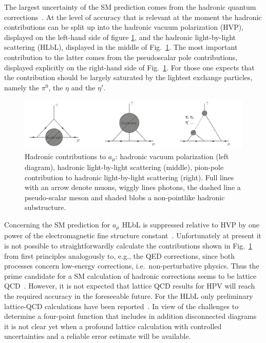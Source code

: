 \documentclass[preprint,12pt,3p]{elsarticle}
\newcommand{\0}{}
\begin{document}
The largest uncertainty of the SM prediction comes from
 the hadronic quantum corrections~\cite{Jegerlehner:2009ry}.
At the level of accuracy that is relevant at the moment the hadronic
contributions can be split up into the hadronic vacuum polarization
(HVP), displayed on the left-hand side of figure \ref{fig:gm2}, and the
hadronic light-by-light scattering (HLbL), displayed in the middle of
Fig.~\ref{fig:gm2}. The most important contribution to the latter
comes from the pseudoscalar pole contributions, displayed explicitly on the right-hand 
side of Fig.~\ref{fig:gm2}. For those one expects that the contribution
should be largely saturated by the lightest exchange particles, namely the 
$\pi^0$, the $\eta$ and the $\eta'$. 
%
\begin{figure}[!h]
\includegraphics[keepaspectratio,width=1.\textwidth]{figures/intro/hadronicgm2.pdf}
\caption{Hadronic contributions to $a_\mu$: hadronic vacuum polarization (left diagram), 
  hadronic light-by-light scattering (middle), pion-pole contribution to hadronic light-by-light scattering (right). 
  Full lines with an arrow denote muons, wiggly lines photons, the dashed line a pseudo-scalar meson and shaded blobs a non-pointlike 
  hadronic substructure.
}
\label{fig:gm2}
\end{figure}

Concerning the SM prediction for $a_\mu$ HLbL is suppressed relative to HVP by one power of the electromagnetic
fine structure constant~\cite{Jegerlehner:2009ry,Bijnens:2007pz}.  
Unfortunately at present it is not possible to straightforwardly 
calculate the contributions shown in Fig.~\ref{fig:gm2} 
from first principles analogously to, e.g., the QED corrections, since
  both processes concern low-energy corrections,
i.e.\ non-perturbative physics. Thus the prime candidate for a SM
calculation of hadronic corrections seems to be lattice QCD~\cite{Gattringer:2010zz}. 
However, it is not expected that lattice QCD
results for HPV will reach the required accuracy in the foreseeable future.
For the HLbL only preliminary lattice-QCD calculations have been reported~\cite{Blum:2014oka}.  
In view of the challenges to determine
a four-point function that includes in addition disconnected diagrams
it is not clear yet when a profound lattice calculation with
controlled uncertainties and a reliable error estimate will be
available.
\end{document}
